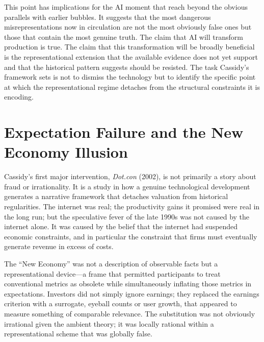 \documentclass[11pt, a4paper]{article}
\theoremstyle{plain}
\theoremstyle{definition}
\begin{document}
This point has implications for the AI moment that reach beyond the obvious
parallels with earlier bubbles. It suggests that the most dangerous
misrepresentations now in circulation are not the most obviously false ones
but those that contain the most genuine truth. The claim that AI will
transform production is true. The claim that this transformation will be
broadly beneficial is the representational extension that the available
evidence does not yet support and that the historical pattern suggests should
be resisted. The task Cassidy's framework sets is not to dismiss the
technology but to identify the specific point at which the representational
regime detaches from the structural constraints it is encoding.

\section{Expectation Failure and the New Economy Illusion}

Cassidy's first major intervention, \emph{Dot.con} (2002), is not primarily
a story about fraud or irrationality. It is a study in how a genuine
technological development generates a narrative framework that detaches
valuation from historical regularities. The internet was real; the productivity
gains it promised were real in the long run; but the speculative fever of the
late 1990s was not caused by the internet alone. It was caused by the belief
that the internet had suspended economic constraints, and in particular the
constraint that firms must eventually generate revenue in excess of costs.

The ``New Economy'' was not a description of observable facts but a
representational device---a frame that permitted participants to treat
conventional metrics as obsolete while simultaneously inflating those metrics
in expectations. Investors did not simply ignore earnings; they replaced the
earnings criterion with a surrogate, eyeball counts or user growth, that
appeared to measure something of comparable relevance. The substitution was
not obviously irrational given the ambient theory; it was locally rational
within a representational scheme that was globally false.
\end{document}
